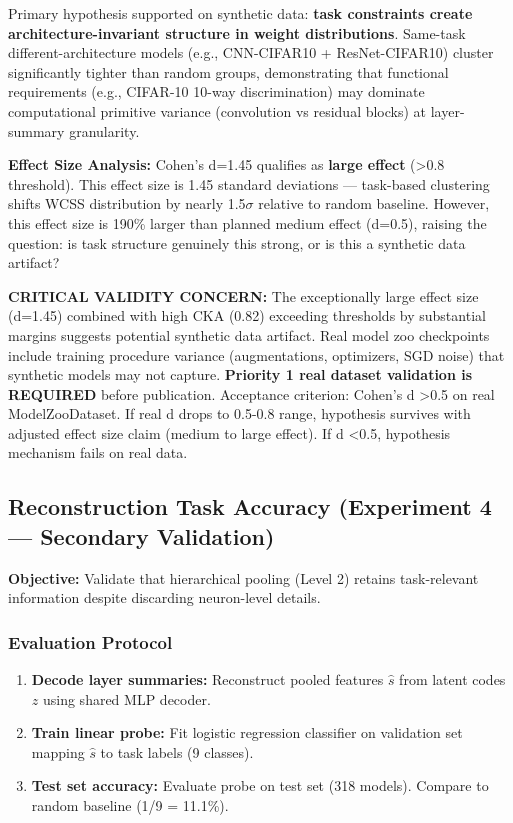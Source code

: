 Primary hypothesis supported on synthetic data: \textbf{task constraints create architecture-invariant structure in weight distributions}. Same-task different-architecture models (e.g., CNN-CIFAR10 + ResNet-CIFAR10) cluster significantly tighter than random groups, demonstrating that functional requirements (e.g., CIFAR-10 10-way discrimination) may dominate computational primitive variance (convolution vs residual blocks) at layer-summary granularity.

\textbf{Effect Size Analysis:} Cohen's d=1.45 qualifies as \textbf{large effect} (>0.8 threshold). This effect size is 1.45 standard deviations --- task-based clustering shifts WCSS distribution by nearly 1.5$\sigma$ relative to random baseline. However, this effect size is 190\% larger than planned medium effect (d=0.5), raising the question: is task structure genuinely this strong, or is this a synthetic data artifact?

\textbf{CRITICAL VALIDITY CONCERN:} The exceptionally large effect size (d=1.45) combined with high CKA (0.82) exceeding thresholds by substantial margins suggests potential synthetic data artifact. Real model zoo checkpoints include training procedure variance (augmentations, optimizers, SGD noise) that synthetic models may not capture. \textbf{Priority 1 real dataset validation is REQUIRED} before publication. Acceptance criterion: Cohen's d >0.5 on real ModelZooDataset. If real d drops to 0.5-0.8 range, hypothesis survives with adjusted effect size claim (medium to large effect). If d <0.5, hypothesis mechanism fails on real data.

\subsection{Reconstruction Task Accuracy (Experiment 4 --- Secondary Validation)}

\textbf{Objective:} Validate that hierarchical pooling (Level 2) retains task-relevant information despite discarding neuron-level details.

\subsubsection{Evaluation Protocol}

\begin{enumerate}
\item \textbf{Decode layer summaries:} Reconstruct pooled features $\hat{s}$ from latent codes $z$ using shared MLP decoder.
\item \textbf{Train linear probe:} Fit logistic regression classifier on validation set mapping $\hat{s}$ to task labels (9 classes).
\item \textbf{Test set accuracy:} Evaluate probe on test set (318 models). Compare to random baseline (1/9 = 11.1\%).
\end{enumerate}

